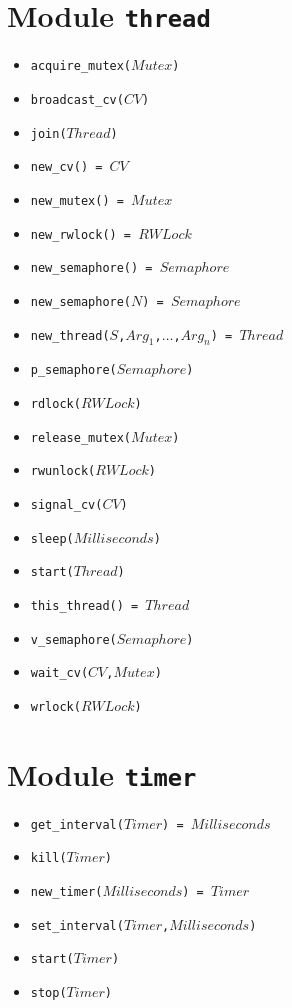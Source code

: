 \documentclass[10pt]{article}
\begin{document}
\begin{multicols}{2}
{\section*{Module \texttt{thread}}
\begin{scriptsize}
\begin{itemize}
    \item \texttt{acquire\_mutex($Mutex$)}
    \item \texttt{broadcast\_cv($CV$)}
    \item \texttt{join($Thread$)}
    \item \texttt{new\_cv() = $CV$}
    \item \texttt{new\_mutex() = $Mutex$}
    \item \texttt{new\_rwlock() = $RWLock$}
    \item \texttt{new\_semaphore() = $Semaphore$}
    \item \texttt{new\_semaphore($N$) = $Semaphore$}
    \item \texttt{new\_thread($S$,$Arg_1$,$\ldots$,$Arg_n$) = $Thread$}
    \item \texttt{p\_semaphore($Semaphore$)}
    \item \texttt{rdlock($RWLock$)}
    \item \texttt{release\_mutex($Mutex$)}
    \item \texttt{rwunlock($RWLock$)}
    \item \texttt{signal\_cv($CV$)}
    \item \texttt{sleep($Milliseconds$)}
    \item \texttt{start($Thread$)}
    \item \texttt{this\_thread() = $Thread$}
    \item \texttt{v\_semaphore($Semaphore$)}
    \item \texttt{wait\_cv($CV$,$Mutex$)}
    \item \texttt{wrlock($RWLock$)}
\end{itemize}
\end{scriptsize}
\section*{Module \texttt{timer}}
\begin{scriptsize}
\begin{itemize}
    \item \texttt{get\_interval($Timer$) = $Milliseconds$}
    \item \texttt{kill($Timer$)}
    \item \texttt{new\_timer($Milliseconds$) = $Timer$}
    \item \texttt{set\_interval($Timer$,$Milliseconds$)}
    \item \texttt{start($Timer$)}
    \item \texttt{stop($Timer$)}
\end{itemize}
\end{scriptsize}
}
\end{multicols}
\end{document}
